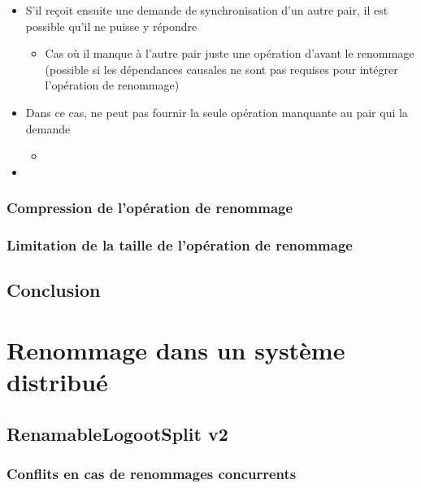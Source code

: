 \documentclass[12pt]{thesul}
\begin{document}
\begin{itemize}
  \item S'il reçoit ensuite une demande de synchronisation d'un autre pair, il est possible qu'il ne puisse y répondre
  \begin{itemize}
    \item Cas où il manque à l'autre pair juste une opération d'avant le renommage (possible si les dépendances causales ne sont pas requises pour intégrer l'opération de renommage)
  \end{itemize}
  \item Dans ce cas, ne peut pas fournir la seule opération manquante au pair qui la demande
  \begin{itemize}
    \item {}
  \end{itemize}
  \item {}
\end{itemize}

\subsection{Compression de l'opération de renommage}
\subsection{Limitation de la taille de l'opération de renommage}
\section{Conclusion}
% 

\NumberThisInToc
\chapter{Renommage dans un système distribué}
\minitoc
\section{RenamableLogootSplit v2}
\subsection{Conflits en cas de renommages concurrents}
\end{document}
